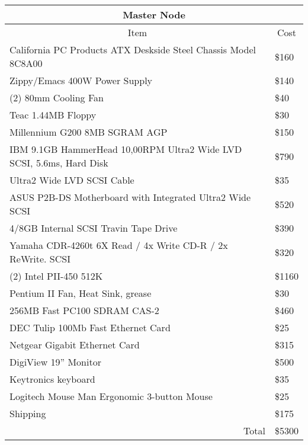 \documentclass{article}
\begin{document}
\begin{tabular}
[c]{|c|c|}\hline\hline
\multicolumn{2}{|c|}{Master Node}\\\hline\hline
Item & Cost\\\cline{1-1}%
\multicolumn{1}{|l|}{California PC Products ATX Deskside Steel Chassis Model
8C8A00} & \multicolumn{1}{|l|}{\$160}\\\cline{1-1}%
\multicolumn{1}{|l|}{Zippy/Emacs 400W Power Supply} &
\multicolumn{1}{|l|}{\$140}\\\cline{1-1}%
\multicolumn{1}{|l|}{(2) 80mm Cooling Fan} & \multicolumn{1}{|l|}{\$40}%
\\\cline{1-1}%
\multicolumn{1}{|l|}{Teac 1.44MB Floppy} & \multicolumn{1}{|l|}{\$30}%
\\\cline{1-1}%
\multicolumn{1}{|l|}{Millennium G200 8MB SGRAM AGP} &
\multicolumn{1}{|l|}{\$150}\\\cline{1-1}%
\multicolumn{1}{|l|}{IBM 9.1GB HammerHead 10,00RPM Ultra2 Wide LVD SCSI,
5.6ms, Hard Disk} & \multicolumn{1}{|l|}{\$790}\\\cline{1-1}%
\multicolumn{1}{|l|}{Ultra2 Wide LVD SCSI Cable} & \multicolumn{1}{|l|}{\$35}%
\\\cline{1-1}%
\multicolumn{1}{|l|}{ASUS P2B-DS Motherboard with Integrated Ultra2 Wide SCSI}%
& \multicolumn{1}{|l|}{\$520}\\\cline{1-1}%
\multicolumn{1}{|l|}{4/8GB Internal SCSI Travin Tape Drive} &
\multicolumn{1}{|l|}{\$390}\\\cline{1-1}%
\multicolumn{1}{|l|}{Yamaha CDR-4260t 6X Read / 4x Write CD-R / 2x ReWrite.
SCSI} & \multicolumn{1}{|l|}{\$320}\\\cline{1-1}%
\multicolumn{1}{|l|}{(2) Intel PII-450 512K} & \multicolumn{1}{|l|}{\$1160}%
\\\cline{1-1}%
\multicolumn{1}{|l|}{Pentium II Fan, Heat Sink, grease} &
\multicolumn{1}{|l|}{\$30}\\\hline
\multicolumn{1}{|l|}{256MB Fast PC100 SDRAM CAS-2} &
\multicolumn{1}{|l|}{\$460}\\\hline
\multicolumn{1}{|l|}{DEC Tulip 100Mb Fast Ethernet Card} &
\multicolumn{1}{|l|}{\$25}\\\hline
\multicolumn{1}{|l|}{Netgear Gigabit Ethernet Card} &
\multicolumn{1}{|l|}{\$315}\\\hline
\multicolumn{1}{|l|}{DigiView 19'' Monitor} & \multicolumn{1}{|l|}{\$500}%
\\\hline
\multicolumn{1}{|l|}{Keytronics keyboard} & \multicolumn{1}{|l|}{\$35}\\\hline
\multicolumn{1}{|l|}{Logitech Mouse Man Ergonomic 3-button Mouse} &
\multicolumn{1}{|l|}{\$25}\\\hline
\multicolumn{1}{|l|}{Shipping} & \multicolumn{1}{|l|}{\$175}\\\hline
\multicolumn{1}{|r|}{Total} & \multicolumn{1}{|l|}{\$5300}\\\hline
\end{tabular}
\end{document}
